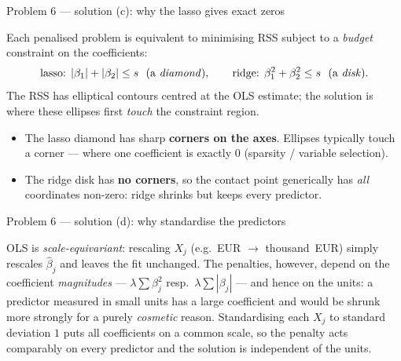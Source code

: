 \documentclass[aspectratio=169,11pt]{beamer}
\begin{document}
\begin{frame}{Problem 6 --- solution (c): why the lasso gives exact zeros}
  \begin{solutionbox}
    Each penalised problem is equivalent to minimising RSS subject to a \emph{budget}
    constraint on the coefficients:
    \[
      \text{lasso: } |\beta_1|+|\beta_2|\le s\ \ (\text{a \emph{diamond}}),
      \qquad
      \text{ridge: } \beta_1^2+\beta_2^2\le s\ \ (\text{a \emph{disk}}).
    \]
    The RSS has elliptical contours centred at the OLS estimate; the solution is where these
    ellipses first \emph{touch} the constraint region.
    \begin{itemize}
      \item The lasso diamond has sharp \textbf{corners on the axes}. Ellipses typically
        touch a corner --- where one coefficient is exactly $0$ (sparsity / variable
        selection).
      \item The ridge disk has \textbf{no corners}, so the contact point generically has
        \emph{all} coordinates non-zero: ridge shrinks but keeps every predictor.
    \end{itemize}
  \end{solutionbox}
\end{frame}

\begin{frame}{Problem 6 --- solution (d): why standardise the predictors}
  \begin{solutionbox}
    OLS is \emph{scale-equivariant}: rescaling $X_j$ (e.g.\ EUR $\to$ thousand~EUR) simply
    rescales $\hat{\beta}_j$ and leaves the fit unchanged. The penalties, however, depend on
    the coefficient \emph{magnitudes} --- $\lambda\sum\beta_j^2$ resp.\ $\lambda\sum|\beta_j|$
    --- and hence on the units: a predictor measured in small units has a large coefficient
    and would be shrunk more strongly for a purely \emph{cosmetic} reason. Standardising each
    $X_j$ to standard deviation $1$ puts all coefficients on a common scale, so the penalty
    acts comparably on every predictor and the solution is independent of the units.
  \end{solutionbox}
\end{frame}
\end{document}
